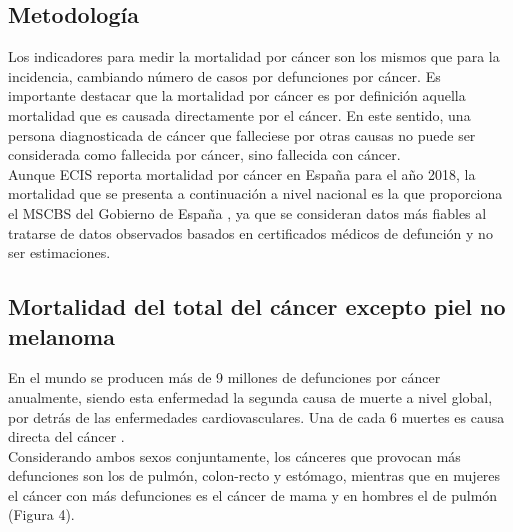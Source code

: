 \subsection{Metodología}

Los indicadores para medir la mortalidad por cáncer son los mismos que para la incidencia, cambiando número de casos por defunciones por cáncer. Es importante destacar que la mortalidad por cáncer es por definición aquella mortalidad que es causada directamente por el cáncer. En este sentido, una persona diagnosticada de cáncer que falleciese por otras causas no puede ser considerada como fallecida por cáncer, sino fallecida con cáncer.\\

Aunque ECIS \cite{ECIS} reporta mortalidad por cáncer en España para el año 2018, la mortalidad que se presenta a continuación a nivel nacional es la que proporciona el MSCBS del Gobierno de España \cite{MSCBS}, ya que se consideran datos más fiables al tratarse de datos observados basados en certificados médicos de defunción y no ser estimaciones.
 
\subsection{Mortalidad del total del cáncer excepto piel no melanoma}

En el mundo se producen más de 9 millones de defunciones por cáncer anualmente, siendo esta enfermedad la segunda causa de muerte a nivel global, por detrás de las enfermedades cardiovasculares. Una de cada 6 muertes es causa directa del cáncer \cite{WorldHealthOrganization2018}.\\

Considerando ambos sexos conjuntamente, los cánceres que provocan más defunciones son los de pulmón, colon-recto y estómago, mientras que en mujeres el cáncer con más defunciones es el cáncer de mama y en hombres el de pulmón (Figura 4).

